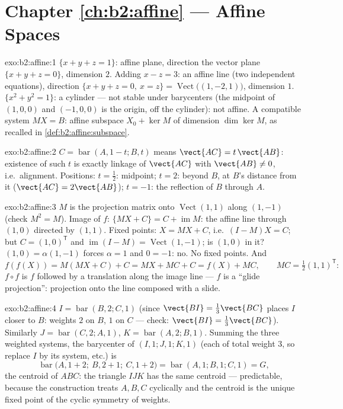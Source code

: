 \section*{Chapter \ref{ch:b2:affine} --- Affine Spaces}

\begin{solution}{exo:b2:affine:1}
$\{x + y + z = 1\}$: affine plane, direction the vector plane $\{x
+ y + z = 0\}$, dimension $2$. Adding $x - z = 3$: an affine line
(two independent equations), direction $\{x + y + z = 0,\ x = z\}
= \operatorname{Vect}\bigl((1, -2, 1)\bigr)$, dimension $1$. $\{x^2
+ y^2 = 1\}$: a cylinder --- not stable under barycenters (the
midpoint of $(1,0,0)$ and $(-1,0,0)$ is the origin, off the
cylinder): not affine. A compatible system $MX = B$: affine
subspace $X_0 + \ker M$ of dimension $\dim\ker M$, as recalled in
\cref{def:b2:affine:subspace}.
\end{solution}

\begin{solution}{exo:b2:affine:2}
$C = \operatorname{bar}(A, 1-t; B, t)$ means $\vect{AC} =
t\,\vect{AB}$: existence of such $t$ is exactly linkage of
$\vect{AC}$ with $\vect{AB} \neq 0$, i.e.\ alignment. Positions: $t
= \frac12$: midpoint; $t = 2$: beyond $B$, at $B$'s distance from
it ($\vect{AC} = 2\vect{AB}$); $t = -1$: the reflection of $B$
through $A$.
\end{solution}

\begin{solution}{exo:b2:affine:3}
$M$ is the projection matrix onto $\operatorname{Vect}(1,1)$ along
$(1,-1)$ (check $M^2 = M$). Image of $f$: $\{MX + C\} = C +
\operatorname{im} M$: the affine line through $(1,0)$ directed by
$(1,1)$. Fixed points: $X = MX + C$, i.e.\ $(I - M)X = C$; but $C =
(1, 0)^{\mathsf T}$ and $\operatorname{im}(I - M) =
\operatorname{Vect}(1,-1)$; is $(1,0)$ in it? $(1, 0) =
\alpha(1,-1)$ forces $\alpha = 1$ and $0 = -1$: no. No fixed
points. And
\[
f(f(X)) = M(MX + C) + C = MX + MC + C = f(X) + MC,
\qquad MC = \tfrac12(1,1)^{\mathsf T} :
\]
$f\circ f$ is $f$ followed by a translation along the image line
--- $f$ is a ``glide projection'': projection onto the line
composed with a slide.
\end{solution}

\begin{solution}{exo:b2:affine:4}
$I = \operatorname{bar}(B, 2; C, 1)$ (since $\vect{BI} =
\frac13\vect{BC}$ places $I$ closer to $B$: weights $2$ on $B$,
$1$ on $C$ --- check: $\vect{BI} = \frac{1}{3}\vect{BC}$).
Similarly $J = \operatorname{bar}(C, 2; A, 1)$, $K =
\operatorname{bar}(A, 2; B, 1)$. Summing the three weighted
systems, the barycenter of $(I, 1; J, 1; K, 1)$ (each of total
weight $3$, so replace $I$ by its system, etc.) is
\[
\operatorname{bar}\bigl(A, 1 + 2;\ B, 2 + 1;\ C, 1 + 2\bigr)
= \operatorname{bar}(A, 1; B, 1; C, 1) = G ,
\]
the centroid of $ABC$: the triangle $IJK$ has the same centroid ---
predictable, because the construction treats $A, B, C$ cyclically
and the centroid is the unique fixed point of the cyclic symmetry
of weights.
\end{solution}

